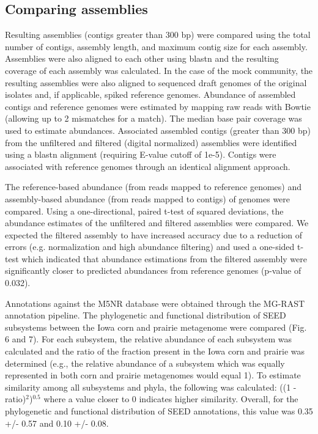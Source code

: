 \documentclass[11pt]{article} %
\begin{document}
\subsection*{Comparing assemblies}
Resulting assemblies (contigs greater than 300 bp) were compared using
the total number of contigs, assembly length, and maximum contig size
for each assembly.  Assemblies were also aligned to each other using
blastn and the resulting coverage of each assembly was calculated.  In
the case of the mock community, the resulting assemblies were also
aligned to sequenced draft genomes of the original isolates and, if
applicable, spiked reference genomes. Abundance of assembled contigs
and reference genomes were estimated by mapping raw reads with Bowtie
(allowing up to 2 mismatches for a match).  The median base pair
coverage was used to estimate abundances.  Associated assembled
contigs (greater than 300 bp) from the unfiltered and filtered
(digital normalized) assemblies were identified using a blastn
alignment (requiring E-value cutoff of 1e-5).  Contigs were associated
with reference genomes through an identical alignment approach.

The reference-based abundance (from reads mapped to reference genomes)
and assembly-based abundance (from reads mapped to contigs) of genomes
were compared.  Using a one-directional, paired t-test of squared
deviations, the abundance estimates of the unfiltered and filtered
assemblies were compared.  We expected the filtered assembly to have
increased accuracy due to a reduction of errors (e.g. normalization
and high abundance filtering) and used a one-sided t-test which
indicated that abundance estimations from the filtered assembly were
significantly closer to predicted abundances from reference genomes
(p-value of 0.032).

Annotations against the M5NR database were obtained through the
MG-RAST annotation pipeline.  The phylogenetic and functional
distribution of SEED subsystems between the Iowa corn and prairie
metagenome were compared (Fig. 6 and 7).  For each subsystem, the
relative abundance of each subsystem was calculated and the ratio of
the fraction present in the Iowa corn and prairie was determined
(e.g., the relative abundance of a subsystem which was equally
represented in both corn and prairie metagenomes would equal 1).  To
estimate similarity among all subsystems and phyla, the following was
calculated: ((1 - ratio)$^2$)$^{0.5}$ where a value closer to 0
indicates higher similarity.  Overall, for the phylogenetic and
functional distribution of SEED annotations, this value was 0.35 +/-
0.57 and 0.10 +/- 0.08.
\end{document}
